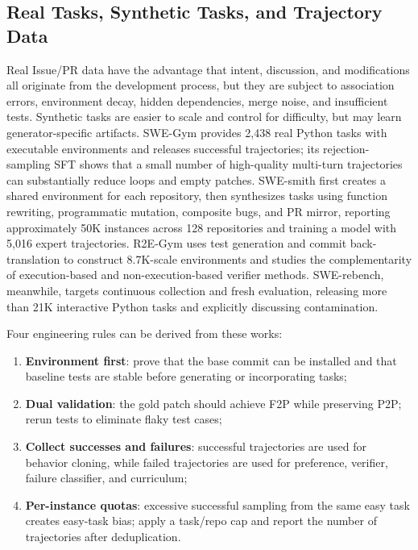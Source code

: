 \documentclass[10pt,a4paper,UTF8,fontset=none]{ctexart}
\begin{document}
\subsection{Real Tasks, Synthetic Tasks, and Trajectory Data}

Real Issue/PR data have the advantage that intent, discussion, and modifications all originate from the development process, but they are subject to association errors, environment decay, hidden dependencies, merge noise, and insufficient tests. Synthetic tasks are easier to scale and control for difficulty, but may learn generator-specific artifacts. SWE-Gym provides 2,438 real Python tasks with executable environments and releases successful trajectories; its rejection-sampling SFT shows that a small number of high-quality multi-turn trajectories can substantially reduce loops and empty patches\cite{en:pan2024swegym}. SWE-smith first creates a shared environment for each repository, then synthesizes tasks using function rewriting, programmatic mutation, composite bugs, and PR mirror, reporting approximately 50K instances across 128 repositories and training a model with 5,016 expert trajectories\cite{en:yang2025swesmith}. R2E-Gym uses test generation and commit back-translation to construct 8.7K-scale environments and studies the complementarity of execution-based and non-execution-based verifier methods\cite{en:jain2025r2egym}. SWE-rebench, meanwhile, targets continuous collection and fresh evaluation, releasing more than 21K interactive Python tasks and explicitly discussing contamination\cite{en:badertdinov2025swerebench}.

Four engineering rules can be derived from these works:

\begin{enumerate}
  \item \textbf{Environment first}: prove that the base commit can be installed and that baseline tests are stable before generating or incorporating tasks;
  \item \textbf{Dual validation}: the gold patch should achieve F2P while preserving P2P; rerun tests to eliminate flaky test cases;
  \item \textbf{Collect successes and failures}: successful trajectories are used for behavior cloning, while failed trajectories are used for preference, verifier, failure classifier, and curriculum;
  \item \textbf{Per-instance quotas}: excessive successful sampling from the same easy task creates easy-task bias; apply a task/repo cap and report the number of trajectories after deduplication.
\end{enumerate}
\end{document}

